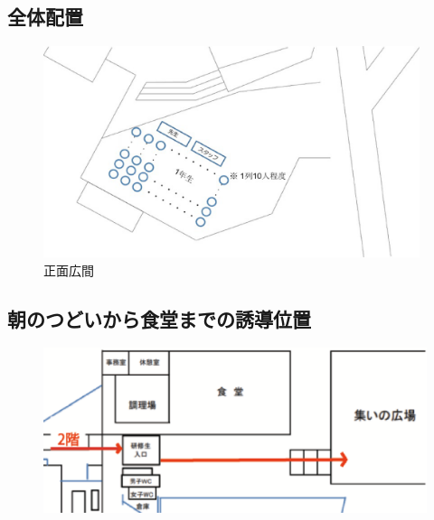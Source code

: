 \subsection{全体配置}
\begin{figure}[h]
\begin{center}
\includegraphics[width = 11cm]{./17/asanotudoihaiti.eps}
\caption{正面広間}
\end{center}
\end{figure}


\subsection{朝のつどいから食堂までの誘導位置}
\begin{figure}[h]
\begin{center}
  \includegraphics[width = 16cm]{./17/asanozu.eps}
\end{center}
\end{figure}



